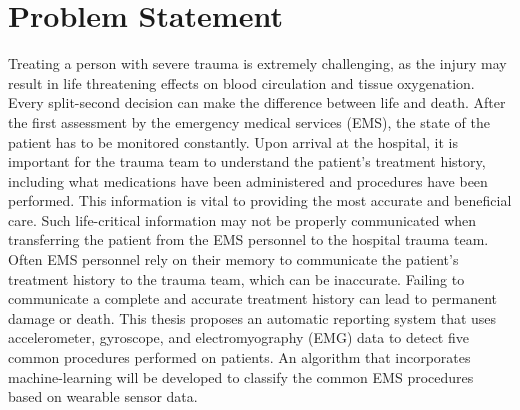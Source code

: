 
\chapter{Problem Statement}
\label{ch:problem-statement}

Treating a person with severe trauma is extremely challenging, as the injury may result in life threatening effects on blood circulation and tissue oxygenation. Every split-second decision can make the difference between life and death. After the first assessment by the emergency medical services (EMS), the state of the patient has to be monitored constantly. Upon arrival at the hospital, it is important for the trauma team to understand the patient's treatment history, including what medications have been administered and procedures have been performed.  This information is vital to providing the most accurate and beneficial care. Such life-critical information may not be properly communicated when transferring the patient from the EMS personnel to the hospital trauma team. Often EMS personnel rely on their memory to communicate the patient's treatment history to the trauma team, which can be inaccurate. Failing to communicate a complete and accurate treatment history can lead to permanent damage or death. This thesis proposes an automatic reporting system that uses accelerometer, gyroscope, and electromyography (EMG) data to detect five common procedures performed on patients. An algorithm that incorporates machine-learning will be developed to classify the common EMS procedures based on wearable sensor data.